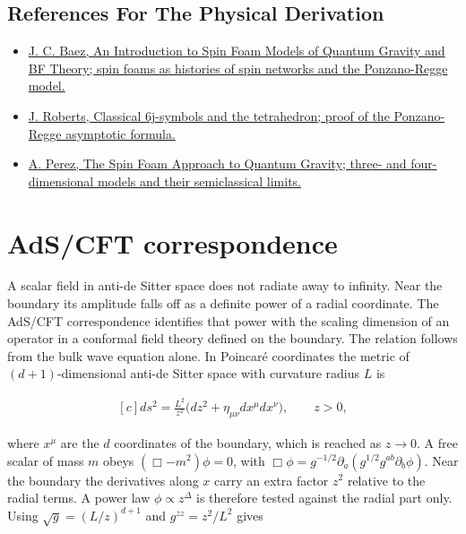 \documentclass[11pt,oneside]{book}
\newenvironment{centeredalign}{\[\begin{gathered}[c]}{\end{gathered}\]}
\begin{document}
\subsection*{References For The Physical Derivation}
\begin{itemize}
\item \href{https://arxiv.org/abs/gr-qc/9905087}{J. C. Baez, An Introduction to Spin Foam Models of Quantum Gravity and BF Theory; spin foams as histories of spin networks and the Ponzano-Regge model.}
\item \href{https://arxiv.org/abs/math-ph/9812013}{J. Roberts, Classical 6j-symbols and the tetrahedron; proof of the Ponzano-Regge asymptotic formula.}
\item \href{https://arxiv.org/abs/1205.2019}{A. Perez, The Spin Foam Approach to Quantum Gravity; three- and four-dimensional models and their semiclassical limits.}
\end{itemize}





\clearpage

\section{AdS/CFT correspondence}

\label{topic:ads-cft-correspondence}

A scalar field in anti-de Sitter space does not radiate away to infinity. Near the boundary its amplitude falls off as a definite power of a radial coordinate. The AdS/CFT correspondence identifies that power with the scaling dimension of an operator in a conformal field theory defined on the boundary. The relation follows from the bulk wave equation alone. In Poincaré coordinates the metric of \((d+1)\)-dimensional anti-de Sitter space with curvature radius \(L\) is

\begin{centeredalign}
ds^2=\frac{L^2}{z^2}\big(dz^2+\eta_{\mu\nu}dx^\mu dx^\nu\big),\qquad z>0,
\end{centeredalign}

where \(x^\mu\) are the \(d\) coordinates of the boundary, which is reached as \(z\to0\). A free scalar of mass \(m\) obeys \((\Box-m^2)\phi=0\), with \(\Box\phi=g^{-1/2}\partial_a(g^{1/2}g^{ab}\partial_b\phi)\). Near the boundary the derivatives along \(x\) carry an extra factor \(z^2\) relative to the radial terms. A power law \(\phi\propto z^\Delta\) is therefore tested against the radial part only. Using \(\sqrt g=(L/z)^{d+1}\) and \(g^{zz}=z^2/L^2\) gives
\end{document}
